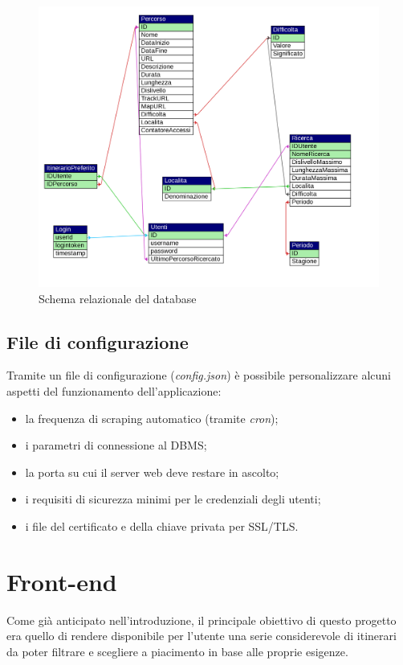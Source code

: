 \documentclass[11pt]{report}
\begin{document}
\begin{figure}
	\centering
	\includegraphics[scale=0.45]{DB_schema}
	\caption{Schema relazionale del database \label{db_schema}}
\end{figure}
\subsection{File di configurazione}
Tramite un file di configurazione (\textit{config.json}) è possibile personalizzare alcuni aspetti del funzionamento dell'applicazione:
\begin{itemize}
	\item la frequenza di scraping automatico (tramite \textit{cron});
	\item i parametri di connessione al DBMS;
	\item la porta su cui il server web deve restare in ascolto;
	\item i requisiti di sicurezza minimi per le credenziali degli utenti;
	\item i file del certificato e della chiave privata per SSL/TLS.
\end{itemize}
\pagebreak

\section{Front-end}
Come già anticipato nell'introduzione, il principale obiettivo di questo progetto era quello di rendere disponibile per l'utente una serie considerevole di itinerari da poter filtrare e scegliere a piacimento in base alle proprie esigenze.
\end{document}
